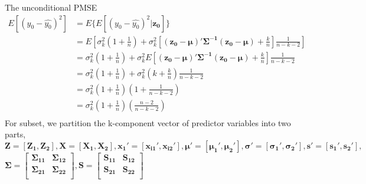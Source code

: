 \documentclass[11pt]{article}
\begin{document}
The unconditional PMSE
$$\begin{aligned}
E[(y_0-\hat{y_0})^2]&=E\{E[(y_0-\hat{y_0})^2|\boldsymbol{z_0}]\}\\
&=E\left[\sigma_k^2\left(1+\frac{1}{n}\right)+\sigma_k^2 \left[\boldsymbol{(z_0-\mu)'\Sigma^{-1}(z_0-\mu)}+\frac{k}{n} \right]\frac{1}{n-k-2}\right]\\
&=\sigma_k^2\left(1+\frac{1}{n}\right)+\sigma_k^2 E\left[\boldsymbol{(z_0-\mu)'\Sigma^{-1}(z_0-\mu)}+\frac{k}{n} \right]\frac{1}{n-k-2}\\
&=\sigma_k^2\left(1+\frac{1}{n}\right)+\sigma_k^2 \left(k+\frac{k}{n} \right)\frac{1}{n-k-2}\\
&=\sigma_k^2\left(1+\frac{1}{n}\right)\left(1+\frac{1}{n-k-2}\right)\\
&=\sigma_k^2\left(1+\frac{1}{n}\right)\left(\frac{n-2}{n-k-2}\right)\\
\end{aligned}
$$
For subset, we partition the k-component vector of predictor variables into two parts, $\boldsymbol{Z=[Z_{1},Z_{2}],X=[X_1,X_2],x_1'=[x_{i1}',x_{i2}'],\mu'=[\mu_1',\mu_2'] ,\sigma'=[\sigma_1',\sigma_2'],s'=[s_1',s_2'],}$ $\boldsymbol{\Sigma}=\begin{bmatrix} 
\boldsymbol{\Sigma_{11}} & \boldsymbol{\Sigma_{12}}\\  
   \boldsymbol{ \Sigma_{21}} & \boldsymbol{\Sigma_{22}} \\  
\end{bmatrix},\boldsymbol{S}=\begin{bmatrix} 
    \boldsymbol{S_{11} }& \boldsymbol{S_{12}} \\  
    \boldsymbol{S_{21}} & \boldsymbol{S_{22}} \\  
\end{bmatrix}$
\end{document}
